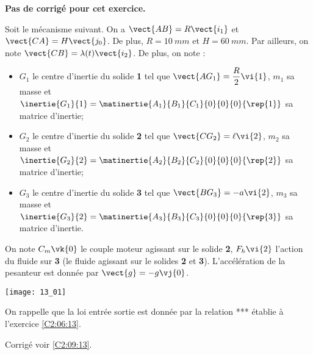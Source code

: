 \normaltrue \difficilefalse \tdifficilefalse
\correctionfalse


\setcounter{numques}{0}

\ifcorrection
\else
\textbf{Pas de corrigé pour cet exercice.}
\fi

\ifprof
\else
Soit le mécanisme suivant. On a $\vect{AB}=R\vect{i_1}$ et $\vect{CA}=H\vect{j_0}$. De plus, 
$R=\SI{10}{mm}$ et $H=\SI{60}{mm}$. Par ailleurs, on note $\vect{CB}=\lambda(t) \vect{i_2}$.
De plus, on note :
\begin{itemize}
\item $G_1$ le centre d'inertie du solide \textbf{1} tel que $\vect{AG_1}=\dfrac{R}{2} \vi{1}$, $m_1$ sa masse et $\inertie{G_1}{1}=\matinertie{A_1}{B_1}{C_1}{0}{0}{0}{\rep{1}}$ sa matrice d'inertie;
\item $G_2$ le centre d'inertie du solide \textbf{2} tel que $\vect{CG_2}=\ell \vi{2}$, $m_2$ sa masse et $\inertie{G_2}{2}=\matinertie{A_2}{B_2}{C_2}{0}{0}{0}{\rep{2}}$ sa matrice d'inertie;
\item $G_3$ le centre d'inertie du solide \textbf{3} tel que $\vect{BG_3}=-a \vi{2}$, $m_3$ sa masse et $\inertie{G_3}{2}=\matinertie{A_3}{B_3}{C_3}{0}{0}{0}{\rep{3}}$ sa matrice d'inertie.
\end{itemize}
On note $C_m\vk{0}$ le couple moteur agissant sur le solide \textbf{2}, $F_h\vi{2}$ l'action du fluide sur \textbf{3} (le fluide agissant sur le solides  \textbf{2} et \textbf{3}). L'accélération de la pesanteur est donnée par $\vect{g}=-g\vj{0}$.

\begin{center}
\texttt{[image: 13\_01]}
\end{center}
\fi

On rappelle que la loi entrée sortie est donnée par la relation *** établie à l'exercice \ref{C2:06:13}.

\ifprof
\else
\fi

\ifprof
\else
\fi

\ifprof
\else
\fi

\ifprof
\else
\fi

\ifprof
\else
\fi


\ifprof
\else
\begin{flushright}
\footnotesize{Corrigé  voir \ref{C2:09:13}.}
\end{flushright}%
\fi